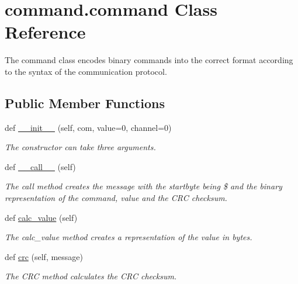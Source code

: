\hypertarget{classcommand_1_1command}{}\section{command.\+command Class Reference}
\label{classcommand_1_1command}


The command class encodes binary commands into the correct format according to the syntax of the communication protocol.  


\subsection*{Public Member Functions}
\begin{DoxyCompactItemize}
\item 
def \hyperlink{classcommand_1_1command_a6743be48c00372cbe1dd3cfa23f6d183}{\+\_\+\+\_\+init\+\_\+\+\_\+} (self, com, value=0, channel=0)
\begin{DoxyCompactList}\small\item\em The constructor can take three arguments. \end{DoxyCompactList}\item 
def \hyperlink{classcommand_1_1command_ad1ad605342adbcf9a8554de183bec046}{\+\_\+\+\_\+call\+\_\+\+\_\+} (self)
\begin{DoxyCompactList}\small\item\em The call method creates the message with the startbyte being \$ and the binary representation of the command, value and the C\+RC checksum. \end{DoxyCompactList}\item 
def \hyperlink{classcommand_1_1command_a66e801fbaee5caa92e17dd9faa15c0c2}{calc\+\_\+value} (self)
\begin{DoxyCompactList}\small\item\em The calc\+\_\+value method creates a representation of the value in bytes. \end{DoxyCompactList}\item 
\mbox{\label{classcommand_1_1command_a5476bbc05d74cc511a0987fb0df72b3c}} 
def \hyperlink{classcommand_1_1command_a5476bbc05d74cc511a0987fb0df72b3c}{crc} (self, message)
\begin{DoxyCompactList}\small\item\em The C\+RC method calculates the C\+RC checksum. \end{DoxyCompactList}\end{DoxyCompactItemize}
